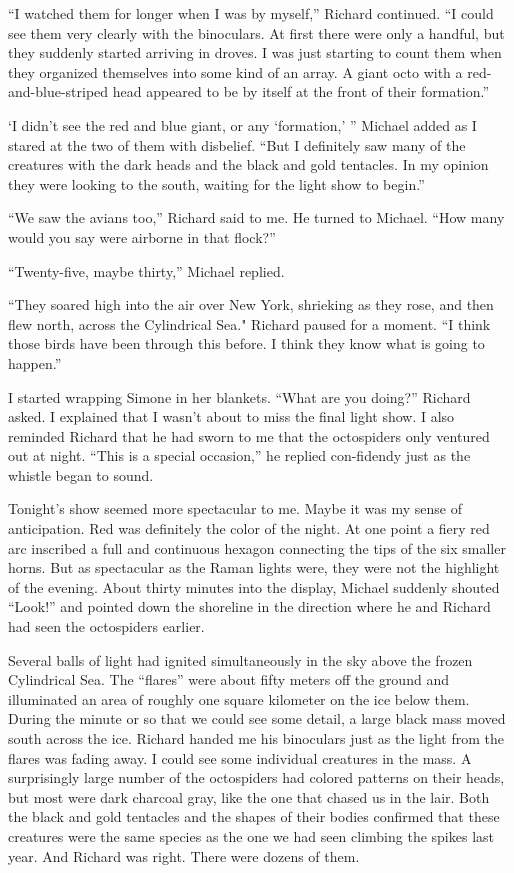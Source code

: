 \documentclass[]{article}
\begin{document}
“I watched them for longer when I was by myself,” Richard continued.  “I could see them very clearly with the binoculars.  At first there were only a handful, but they suddenly started arriving in droves.  I was just starting to count them when they organized themselves into some kind of an array.  A giant octo with a red-and-blue-striped head appeared to be by itself at the front of their formation.”

‘I didn’t see the red and blue giant, or any ‘formation,’ ” Michael added as I stared at the two of them with disbelief.  “But I definitely saw many of the creatures with the dark heads and the black and gold tentacles.  In my opinion they were looking to the south, waiting for the light show to begin.”

“We saw the avians too,” Richard said to me.  He turned to Michael.  “How many would you say were airborne in that flock?”

“Twenty-five, maybe thirty,” Michael replied.

“They soared high into the air over New York, shrieking as they rose, and then flew north, across the Cylindrical Sea."  Richard paused for a moment.  “I think those birds have been through this before.  I think they know what is going to happen.”

I started wrapping Simone in her blankets.  “What are you doing?” Richard asked.  I explained that I wasn’t about to miss the final light show.  I also reminded Richard that he had sworn to me that the octospiders only ventured out at night.  “This is a special occasion,” he replied con-fidendy just as the whistle began to sound.

Tonight’s show seemed more spectacular to me.  Maybe it was my sense of anticipation.  Red was definitely the color of the night.  At one point a fiery red arc inscribed a full and continuous hexagon connecting the tips of the six smaller horns.  But as spectacular as the Raman lights were, they were not the highlight of the evening.  About thirty minutes into the display, Michael suddenly shouted “Look!” and pointed down the shoreline in the direction where he and Richard had seen the octospiders earlier.

Several balls of light had ignited simultaneously in the sky above the frozen Cylindrical Sea.  The “flares” were about fifty meters off the ground and illuminated an area of roughly one square kilometer on the ice below them.  During the minute or so that we could see some detail, a large black mass moved south across the ice.  Richard handed me his binoculars just as the light from the flares was fading away.  I could see some individual creatures in the mass.  A surprisingly large number of the octospiders had colored patterns on their heads, but most were dark charcoal gray, like the one that chased us in the lair.  Both the black and gold tentacles and the shapes of their bodies confirmed that these creatures were the same species as the one we had seen climbing the spikes last year.  And Richard was right.  There were dozens of them.
\end{document}
